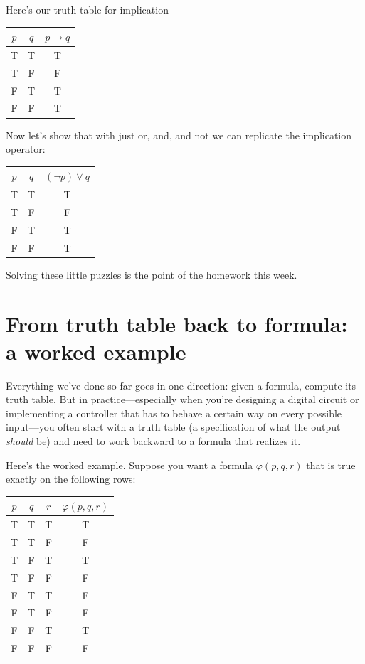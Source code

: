 \documentclass[11pt]{article}
\begin{document}
Here's our truth table for implication

\begin{center}
\begin{tabular}{cc|c}
\toprule
$p$ & $q$ & $p \to q$ \\
\midrule
T & T & T \\
T & F & F \\
F & T & T \\
F & F & T \\
\bottomrule
\end{tabular}
\end{center}

Now let's show that with just or, and, and not we can replicate the implication operator:

\begin{center}
\begin{tabular}{cc|c}
\toprule
$p$ & $q$ & $(\lnot p) \vee q$ \\
\midrule
T & T & T \\
T & F & F \\
F & T & T \\
F & F & T \\
\bottomrule
\end{tabular}
\end{center}

Solving these little puzzles is the point of the homework this week.

\section{From truth table back to formula: a worked example}

Everything we've done so far goes in one direction: given a formula, compute its truth table. But in practice---especially when you're designing a digital circuit or implementing a controller that has to behave a certain way on every possible input---you often start with a truth table (a specification of what the output \emph{should} be) and need to work backward to a formula that realizes it.

Here's the worked example. Suppose you want a formula $\varphi(p, q, r)$ that is true exactly on the following rows:

\begin{center}
\begin{tabular}{ccc|c}
\toprule
$p$ & $q$ & $r$ & $\varphi(p,q,r)$ \\
\midrule
T & T & T & T \\
T & T & F & F \\
T & F & T & T \\
T & F & F & F \\
F & T & T & F \\
F & T & F & F \\
F & F & T & T \\
F & F & F & F \\
\bottomrule
\end{tabular}
\end{center}
\end{document}
